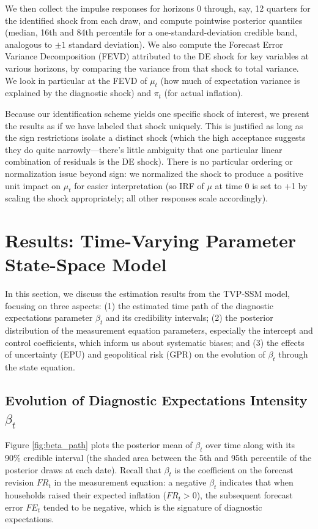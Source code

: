 \documentclass[12pt]{article}
\begin{document}
We then collect the impulse responses for horizons 0 through, say, 12 quarters for the identified shock from each draw, and compute pointwise posterior quantiles (median, 16th and 84th percentile for a one-standard-deviation credible band, analogous to $\pm1$ standard deviation). We also compute the Forecast Error Variance Decomposition (FEVD) attributed to the DE shock for key variables at various horizons, by comparing the variance from that shock to total variance. We look in particular at the FEVD of $\mu_t$ (how much of expectation variance is explained by the diagnostic shock) and $\pi_t$ (for actual inflation).

Because our identification scheme yields one specific shock of interest, we present the results as if we have labeled that shock uniquely. This is justified as long as the sign restrictions isolate a distinct shock (which the high acceptance suggests they do quite narrowly—there's little ambiguity that one particular linear combination of residuals is the DE shock). There is no particular ordering or normalization issue beyond sign: we normalized the shock to produce a positive unit impact on $\mu_t$ for easier interpretation (so IRF of $\mu$ at time 0 is set to +1 by scaling the shock appropriately; all other responses scale accordingly).

\section{Results: Time-Varying Parameter State-Space Model}\label{sec:results_ssm}
In this section, we discuss the estimation results from the TVP-SSM model, focusing on three aspects: (1) the estimated time path of the diagnostic expectations parameter $\beta_t$ and its credibility intervals; (2) the posterior distribution of the measurement equation parameters, especially the intercept and control coefficients, which inform us about systematic biases; and (3) the effects of uncertainty (EPU) and geopolitical risk (GPR) on the evolution of $\beta_t$ through the state equation.

\subsection{Evolution of Diagnostic Expectations Intensity $\beta_t$}
Figure \ref{fig:beta_path} plots the posterior mean of $\beta_t$ over time along with its 90\% credible interval (the shaded area between the 5th and 95th percentile of the posterior draws at each date). Recall that $\beta_t$ is the coefficient on the forecast revision $FR_t$ in the measurement equation: a negative $\beta_t$ indicates that when households raised their expected inflation ($FR_t > 0$), the subsequent forecast error $FE_t$ tended to be negative, which is the signature of diagnostic expectations.
\end{document}
